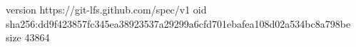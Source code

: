 version https://git-lfs.github.com/spec/v1
oid sha256:dd9f423857fc345ea38923537a29299a6cfd701ebafea108d02a534bc8a798be
size 43864
